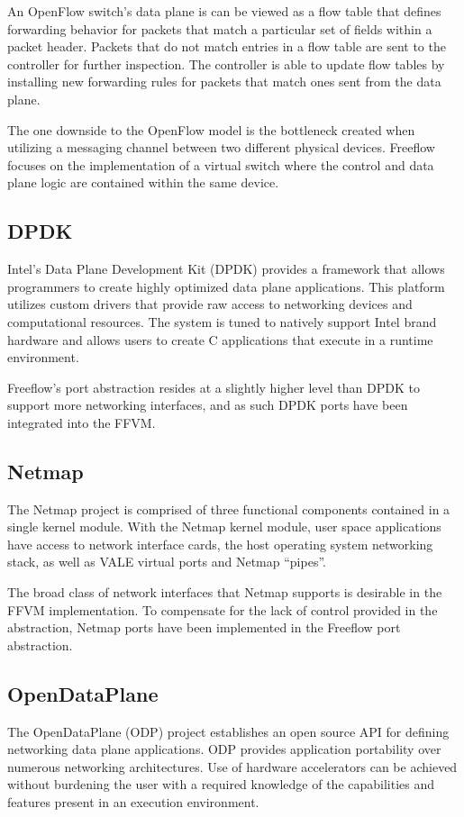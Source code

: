 An OpenFlow switch's data plane is can be viewed as a flow table that defines
forwarding behavior for packets that match a particular set of fields within
a packet header. Packets that do not match entries in a flow table are sent
to the controller for further inspection. The controller is able to update flow
tables by installing new forwarding rules for packets that match ones sent
from the data plane.

The one downside to the OpenFlow model is the bottleneck created when utilizing
a messaging channel between two different physical devices. Freeflow focuses
on the implementation of a virtual switch where the control and data plane
logic are contained within the same device.

\subsection{DPDK}
\label{related:dpdk}
Intel's Data Plane Development Kit (DPDK) \cite{dpdk} provides a framework that
allows programmers to create highly optimized data plane applications. This
platform utilizes custom drivers that provide raw access to networking devices
and computational resources. The system is tuned to natively support Intel
brand hardware and allows users to create C applications that execute in
a runtime environment.

Freeflow's port abstraction resides at a slightly higher level than DPDK to support more networking interfaces, and as such DPDK ports have been integrated into the FFVM.

\subsection{Netmap}
\label{related:netmap}
The Netmap project \cite{netmap} is comprised of three functional components
contained in a single kernel module. With the Netmap kernel module, user space
applications have access to network interface cards, the host operating system
networking stack, as well as VALE virtual ports and Netmap ``pipes''.

The broad class of network interfaces that Netmap supports is desirable in the
FFVM implementation. To compensate for the lack of control provided in the
abstraction, Netmap ports have been implemented in the Freeflow port abstraction.

\subsection{OpenDataPlane}
\label{related:odp}
The OpenDataPlane (ODP) project \cite{odp} establishes an open source API for
defining networking data plane applications. ODP provides application
portability over numerous networking architectures. Use of hardware
accelerators can be achieved without burdening the user with a required
knowledge of the capabilities and features present in an execution environment.

